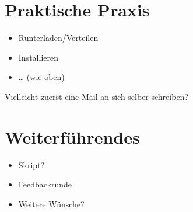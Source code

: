 \documentclass[compress]{beamer}
\begin{document}
\section{Praktische Praxis}
\label{sec-1-1-6}

\begin{itemize}
\item Runterladen/Verteilen
\item Installieren
\item \ldots{} (wie oben)
\end{itemize}

Vielleicht zuerst eine Mail an sich selber schreiben?
\section{Weiterführendes}
\label{sec-1-1-7}

\begin{itemize}
\item Skript?
\item Feedbackrunde
\item Weitere Wünsche?
\end{itemize}
\end{document}
